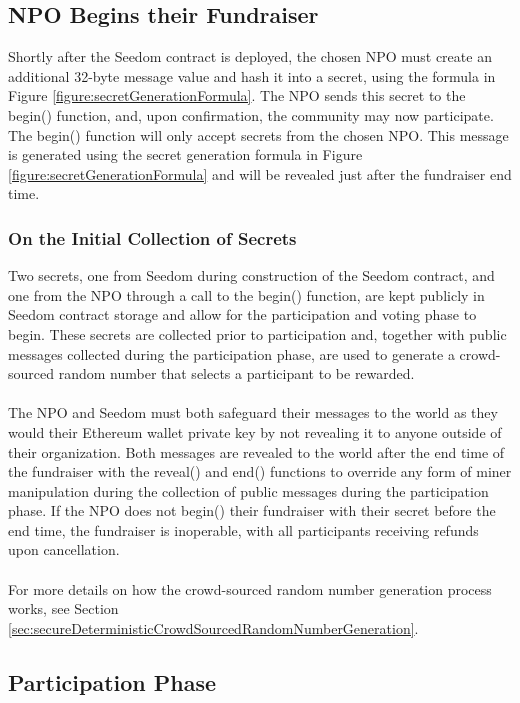 \documentclass[11pt]{article}
\begin{document}
\subsection{NPO Begins their Fundraiser}

Shortly after the Seedom contract is deployed, the chosen NPO must create an additional 32-byte message value and hash it into a secret, using the formula in Figure \ref{figure:secretGenerationFormula}. The NPO sends this secret to the begin() function, and, upon confirmation, the community may now participate. The begin() function will only accept secrets from the chosen NPO. This message is generated using the secret generation formula in Figure \ref{figure:secretGenerationFormula} and will be revealed just after the fundraiser end time.

\subsubsection{On the Initial Collection of Secrets}

Two secrets, one from Seedom during construction of the Seedom contract, and one from the NPO through a call to the begin() function, are kept publicly in Seedom contract storage and allow for the participation and voting phase to begin. These secrets are collected prior to participation and, together with public messages collected during the participation phase, are used to generate a crowd-sourced random number that selects a participant to be rewarded.\\\\
The NPO and Seedom must both safeguard their messages to the world as they would their Ethereum wallet private key by not revealing it to anyone outside of their organization. Both messages are revealed to the world after the end time of the fundraiser with the reveal() and end() functions to override any form of miner manipulation during the collection of public messages during the participation phase. If the NPO does not begin() their fundraiser with their secret before the end time, the fundraiser is inoperable, with all participants receiving refunds upon cancellation.\\\\
For more details on how the crowd-sourced random number generation process works, see Section \ref{sec:secureDeterministicCrowdSourcedRandomNumberGeneration}.

\subsection{Participation Phase}
\end{document}
